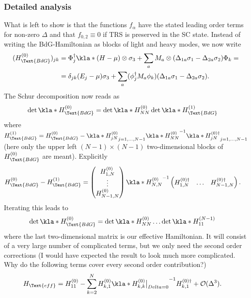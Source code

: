\documentclass[english, parskip=full]{scrartcl}
\newcommand{\qna}[1]{\color{red}#1\color{black}}
\begin{document}
\subsubsection{Detailed analysis}
What is left to show is that the functions $f_\alpha$ have the stated leading order terms for non-zero $\Delta$ and that $f_{0,2} \equiv 0$ if TRS is preserved in the SC state.
Instead of writing the BdG-Hamiltonian as blocks of light and heavy modes, we now write
\begin{align}
(H_\Text{BdG}^{(0)})_{jk} &= \Phi_j^\dagger \kla*{ (H - \mu) \otimes \sigma_3 + \sum_a M_a \otimes (\Delta_{1a} \sigma_1 - \Delta_{2a} \sigma_2) } \Phi_k = \\
&= \delta_{jk} (E_j - \mu)\sigma_3 + \sum_a (\phi_j^\dagger M_a \phi_k) (\Delta_{1a}\sigma_1 - \Delta_{2a} \sigma_2).
\end{align}
The Schur decomposition now reads as 
\begin{align}
\det \kla*{H_\Text{BdG}^{(0)}} &= \det \kla*{H_{NN}^{(0)} } \det \kla*{H_\Text{BdG}^{(1)}}
\end{align}
where $H_\Text{BdG}^{(1)} = H_\Text{BdG}^{(0)} - \kla*{H_{jN}^{(0)}}_{j=1,\dots,N-1} \kla*{H_{NN}^{(0)}}^{-1} \kla*{H_{jN}^{(0)\dagger}}_{j=1,\dots,N-1}$ (here only the upper left $(N-1)\times (N-1)$ two-dimensional blocks of $H_\Text{BdG}^{(0)}$ are meant).
Explicitly
\begin{align}
H_\Text{BdG}^{(0)} - H_\Text{BdG}^{(1)} &= \begin{pmatrix}
H_{1,N}^{(0)} \\ \vdots \\ H_{N-1,N}^{(0)}
\end{pmatrix} \kla*{H_{N,N}^{(0)}}^{-1} \begin{pmatrix}
H_{1,N}^{(0)\dagger} & \hdots & H_{N-1,N}^{(0)\dagger}
\end{pmatrix}.
\end{align}
Iterating this leads to
\begin{align}
\det \kla*{H_\Text{BdG}^{(0)}} &= \det \kla*{H_{NN}^{(0)}} \dots \det \kla*{H_{11}^{(N-1)}}
\end{align}
where the last two-dimensional matrix is our effective Hamiltonian.
It will consist of a very large number of complicated terms, but we only need the second order corrections (\qna{I would have expected the result to look much more complicated. Why do the following terms cover every second order contribution?})
\begin{align}
H_\Text{eff} &= H_{11}^{(0)} - \sum_{k=2}^N H_{k,1}^{(0)} \kla*{H_{k,k}^{(0)} \big\vert_{Delta=0} }^{-1} H_{k,1}^{(0)\dagger} + \mathcal{O}(\Delta^3).
\end{align}
\end{document}
